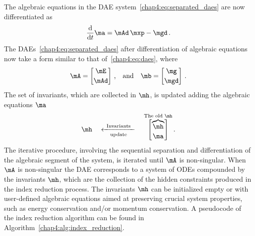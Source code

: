 The algebraic equations in the \ac{DAE} system~\eqref{chap4:eq:separated_daes} are now differentiated as
%
\begin{equation*}
  \dfrac{\mathrm{d}}{\mathrm{d}t} \ma = \mAd \, \mxp - \mgd \, \text{.}
\end{equation*}
%
The \acp{DAE}~\eqref{chap4:eq:separated_daes} after differentiation of algebraic equations now take a form similar to that of~\eqref{chap4:eq:daes}, where
%
\begin{equation*}
  \mA = \begin{bmatrix} \mE \\[0.2em] \mAd\end{bmatrix} \, \text{,}
  \quad \text{and} \quad
  \mb = \begin{bmatrix} \mg \\[0.2em] \mgd\end{bmatrix} \, \text{.}
\end{equation*}
%
The set of invariants, which are collected in $\mh$, is updated adding the algebraic equations $\ma$
%
\begin{equation*}
  \mh \quad \xleftarrow[\text{update}]{\text{\, Invariants \,}} \quad \overset{{\text{The old $\mh$}}}{\begin{bmatrix} \overbrace{\mh} \\[0.2em] \ma \end{bmatrix}} \, \text{.}
\end{equation*}
%
The iterative procedure, involving the sequential separation and differentiation of the algebraic segment of the system, is iterated until $\mA$ is non-singular. When $\mA$ is non-singular the \ac{DAE} corresponds to a system of \acp{ODE} compounded by the invariants $\mh$, which are the collection of the hidden constraints produced in the index reduction process. The invariants $\mh$ can be initialized empty or with user-defined algebraic equations aimed at preserving crucial system properties, such as energy conservation and/or momentum conservation. A pseudocode of the index reduction algorithm can be found in Algorithm~\ref{chap4:alg:index_reduction}.

